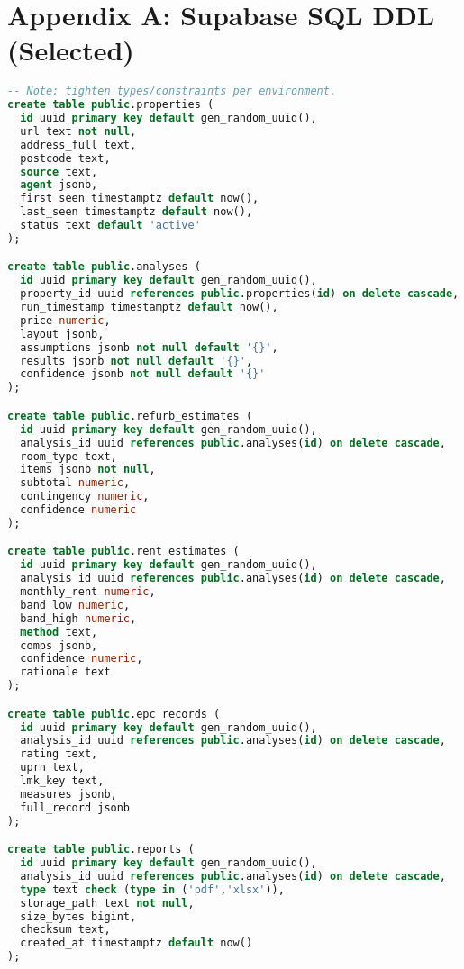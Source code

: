 \documentclass[12pt,a4paper]{article}
\begin{document}
\section*{Appendix A: Supabase SQL DDL (Selected)}
\begin{lstlisting}[language=SQL]
-- Note: tighten types/constraints per environment.
create table public.properties (
  id uuid primary key default gen_random_uuid(),
  url text not null,
  address_full text,
  postcode text,
  source text,
  agent jsonb,
  first_seen timestamptz default now(),
  last_seen timestamptz default now(),
  status text default 'active'
);

create table public.analyses (
  id uuid primary key default gen_random_uuid(),
  property_id uuid references public.properties(id) on delete cascade,
  run_timestamp timestamptz default now(),
  price numeric,
  layout jsonb,
  assumptions jsonb not null default '{}',
  results jsonb not null default '{}',
  confidence jsonb not null default '{}'
);

create table public.refurb_estimates (
  id uuid primary key default gen_random_uuid(),
  analysis_id uuid references public.analyses(id) on delete cascade,
  room_type text,
  items jsonb not null,
  subtotal numeric,
  contingency numeric,
  confidence numeric
);

create table public.rent_estimates (
  id uuid primary key default gen_random_uuid(),
  analysis_id uuid references public.analyses(id) on delete cascade,
  monthly_rent numeric,
  band_low numeric,
  band_high numeric,
  method text,
  comps jsonb,
  confidence numeric,
  rationale text
);

create table public.epc_records (
  id uuid primary key default gen_random_uuid(),
  analysis_id uuid references public.analyses(id) on delete cascade,
  rating text,
  uprn text,
  lmk_key text,
  measures jsonb,
  full_record jsonb
);

create table public.reports (
  id uuid primary key default gen_random_uuid(),
  analysis_id uuid references public.analyses(id) on delete cascade,
  type text check (type in ('pdf','xlsx')),
  storage_path text not null,
  size_bytes bigint,
  checksum text,
  created_at timestamptz default now()
);
\end{lstlisting}
\end{document}
